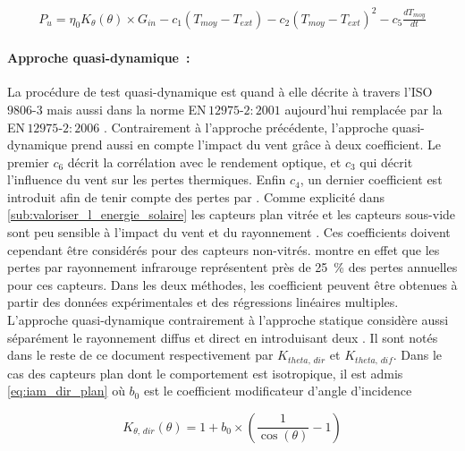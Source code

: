 \begin{equation}\label{eq:instantanee_complete}
    \begin{aligned}
        P_{u} = \eta_{0} K_{\theta}(\theta) \times G_{in} - c_{1} (T_{moy} - T_{ext}) - c_{2} (T_{moy}
                - T_{ext})^{2} - c_{5}\frac{dT_{moy}}{dt}
    \end{aligned}
\end{equation}


\paragraph{Approche quasi-dynamique~:} %
\label{par:approche_quasi_dynamique}
La procédure de test quasi-dynamique est quand à elle décrite à travers l’ISO\,$9806$-$3$
mais aussi dans la norme EN\,$12975$-$2:2001$ \parencite{EN1297522001} aujourd’hui
remplacée par la EN\,$12975$-$2:2006$ \parencite{EN1297522006}.
Contrairement à l’approche précédente, l’approche quasi-dynamique prend aussi en
compte l’impact du vent grâce à deux coefficient. Le premier $c_{6}$ décrit la
corrélation avec le rendement optique, et $c_{3}$ qui décrit l’influence
du vent sur les pertes thermiques. Enfin $c_{4}$, un dernier coefficient est introduit afin
de tenir compte des pertes par . Comme explicité dans \ref{sub:valoriser_l_energie_solaire}
les capteurs plan vitrée et les capteurs sous-vide sont peu sensible à l’impact du
vent et du rayonnement . Ces coefficients doivent cependant être considérés
pour des capteurs non-vitrés. \textcite{Hunn197733} montre en effet que les pertes
par rayonnement infrarouge représentent près de \SI{25}{\percent} des pertes annuelles
pour ces capteurs. Dans les deux méthodes, les coefficient peuvent être obtenues à
partir des données expérimentales et des régressions linéaires multiples.
L’approche quasi-dynamique contrairement à l’approche statique considère aussi séparément
le rayonnement diffus et direct en introduisant deux . Il sont notés dans le reste
de ce document respectivement par $K_{theta,\,dir}$ et $K_{theta,\,dif}$.
Dans le cas des capteurs plan dont le comportement est
isotropique, il est admis \eqref{eq:iam_dir_plan} où $b_{0}$ est le coefficient
modificateur d’angle d’incidence \parencite{Zambolin20101382}

\begin{equation}\label{eq:iam_dir_plan}
    K_{\theta,\,dir} (\theta) = 1 + b_{0} \times \left(\frac{1}{\cos(\theta)} - 1\right)
\end{equation}

